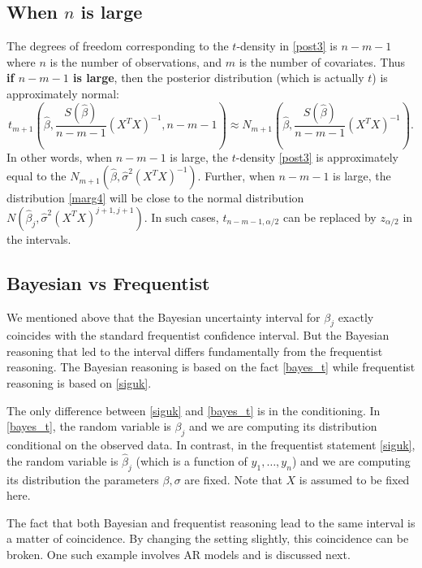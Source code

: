 \documentclass{scrartcl}
\begin{document}
\subsection{When $n$ is large}

The degrees of freedom corresponding to the $t$-density in \eqref{post3} is $n - m - 1$ where
$n$ is the number of observations, and $m$ is the number of
covariates. Thus \textbf{if $n-m-1$ is large}, then the posterior
distribution (which is actually $t$) is approximately normal: 
\begin{equation*}
    t_{m+1}\left(\hat{\beta},\frac{S(\hat{\beta})}{n - m - 1} \left(X^T
      X 
  \right)^{-1}, n - m - 1 \right) \approx N_{m+1}(\hat{\beta},
\frac{S(\hat{\beta})}{n - m - 1} \left(X^T X  \right)^{-1}).  
\end{equation*}
In other words, when $n-m-1$ is large, the $t$-density \eqref{post3} is approximately
equal to the $N_{m+1}(\hat{\beta}, \hat{\sigma}^2 (X^T
X)^{-1})$. Further, when $n-m-1$ is large, the distribution \eqref{marg4}
will be close to the normal  distribution $N(\hat{\beta}_j,
\hat{\sigma}^2 (X^T X)^{j+1, j+1})$. In such cases, $t_{n-m-1,
  \alpha/2}$ can be replaced by $z_{\alpha/2}$ in the intervals. 

\subsection{Bayesian vs Frequentist}
We mentioned above that the Bayesian uncertainty interval for
$\beta_j$ exactly coincides with the standard frequentist confidence
interval. But the Bayesian reasoning that led to the interval differs
fundamentally from the frequentist reasoning. The Bayesian reasoning
is based on the fact \eqref{bayes_t} while frequentist reasoning is
based on \eqref{siguk}. 

The only difference between \eqref{siguk} and \eqref{bayes_t} is in
the conditioning. In \eqref{bayes_t}, the random variable is $\beta_j$
and we are computing its distribution conditional on the observed
data. In contrast, in the frequentist statement \eqref{siguk}, the
random variable is $\hat{\beta}_j$ (which is a function of $y_1,
\dots, y_n$) and we are computing its distribution the parameters
$\beta, \sigma$ are fixed.  Note that $X$ is assumed to be fixed
here.

The fact that both Bayesian and frequentist reasoning lead to the same
interval is a matter of coincidence. By changing the setting slightly,
this coincidence can be broken. One such example involves AR models
and is discussed next. 
\end{document}
